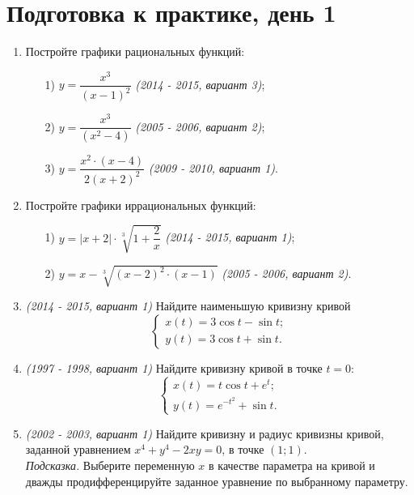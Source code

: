 \documentclass[a4paper,12pt]{article}
\begin{document}
\section*{Подготовка к практике, день 1}

\begin{enumerate}
     	\item Постройте графики рациональных функций:
     	\begin{enumerate}
     		\item[1)] $y = \dfrac{x^3}{(x - 1)^2}$ \textit{(2014 - 2015, вариант 3)};
     		\item[2)] $y = \dfrac{x^3}{(x^2 - 4)}$ \textit{(2005 - 2006, вариант 2)};
     		\item[3)] $y = \dfrac{x^2 \cdot (x - 4)}{2 (x + 2)^2}$ \textit{(2009 - 2010, вариант 1)}.
     	\end{enumerate}
     	
     	\item Постройте графики иррациональных функций:
     	\begin{enumerate}
     		\item[1)] $y = |x + 2| \cdot \sqrt[3]{1 + \dfrac{2}{x}} $ \textit{(2014 - 2015, вариант 1)};
     		\item[2)] $y = x - \sqrt[3]{(x - 2)^2 \cdot (x - 1)}$ \textit{(2005 - 2006, вариант 2)}.
     	\end{enumerate} 
     	
     	\item \textit{(2014 - 2015, вариант 1)} Найдите наименьшую кривизну кривой 
     		\[ \begin{cases}
     			x(t) = 3 \cos{t} - \sin{t}; \\
     			y(t) = 3 \cos{t} + \sin{t}.
     		\end{cases} \]
     	
     	\item \textit{(1997 - 1998, вариант 1)} Найдите кривизну кривой в точке $t = 0$:
     		\[ \begin{cases}
     			x(t) = t \cos{t} + e^t; \\
     			y(t) = e^{-t^2} + \sin{t}.
     		\end{cases} \]
     	
     	\item \textit{(2002 - 2003, вариант 1)} Найдите кривизну и радиус кривизны кривой, заданной уравнением $x^4 + y^4 - 2xy = 0$, в точке $(1; 1)$. \\
     	\textit{Подсказка.} Выберите переменную $x$ в качестве параметра на кривой и дважды продифференцируйте заданное уравнение по выбранному параметру.
\end{enumerate}
\end{document}
